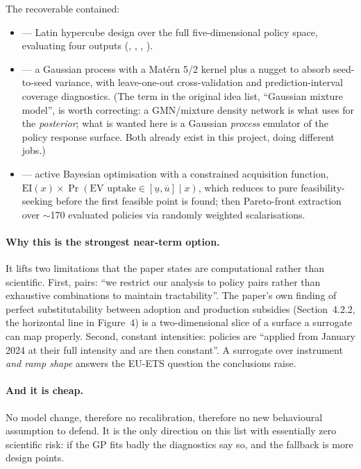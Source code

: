 \documentclass[11pt]{article}
\begin{document}
The recoverable  contained:
\begin{itemize}[leftmargin=1.5em]
\item {} --- Latin hypercube design over the full
  five-dimensional policy space, evaluating four outputs
  (, , , ).
\item {} --- a Gaussian process with a Mat\'ern 5/2 kernel
  plus a  nugget to absorb seed-to-seed variance, with
  leave-one-out cross-validation and prediction-interval coverage
  diagnostics. (The term in the original idea list, ``Gaussian mixture
  model'', is worth correcting: a GMN/mixture density network is what
   uses for the \emph{posterior}; what is wanted here is a
  Gaussian \emph{process} emulator of the policy response surface. Both
  already exist in this project, doing different jobs.)
\item {} --- active Bayesian optimisation with a
  constrained acquisition function,
  $\mathrm{EI}(x) \times \Pr(\text{EV uptake} \in [\underline{u},
  \overline{u}] \mid x)$, which reduces to pure feasibility-seeking before
  the first feasible point is found; then Pareto-front extraction over
  $\sim$170 evaluated policies via randomly weighted scalarisations.
\end{itemize}

\paragraph{Why this is the strongest near-term option.} It lifts two
limitations that the paper states are computational rather than scientific.
First, pairs: ``we restrict our analysis to policy pairs rather than
exhaustive combinations to maintain tractability''. The paper's own finding
of perfect substitutability between adoption and production subsidies
(Section~4.2.2, the horizontal line in Figure~4) is a two-dimensional slice
of a surface a surrogate can map properly. Second, constant intensities:
policies are ``applied from January 2024 at their full intensity and are
then constant''. A surrogate over instrument \emph{and ramp shape} answers
the EU-ETS question the conclusions raise.

\paragraph{And it is cheap.} No model change, therefore no recalibration,
therefore no new behavioural assumption to defend. It is the only direction
on this list with essentially zero scientific risk: if the GP fits badly
the diagnostics say so, and the fallback is more design points.
\end{document}
